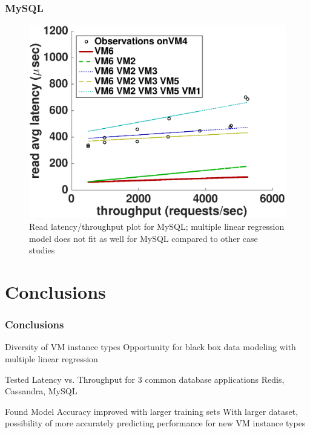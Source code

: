 \documentclass{beamer}
\begin{document}
\begin{frame}
\frametitle{MySQL}
  \begin{figure}
    \centering
    \includegraphics[scale = 0.3]{mysql_fit_read_avg_latency.eps}
    \caption{Read latency/throughput plot for MySQL; multiple linear regression model does not fit as well for MySQL compared to other case studies}
    \label{figure:mysql}
  \end{figure}
\end{frame}

\section{Conclusions}

\begin{frame}
\frametitle{Conclusions}
\begin{block}{Diversity of VM instance types}
Opportunity for black box data modeling with multiple linear regression
\end{block}
\begin{block}{Tested Latency vs. Throughput for 3 common database applications}
Redis, Cassandra, MySQL
\end{block}
\begin{block}{Found Model Accuracy improved with larger training sets}
With larger dataset, possibility of more accurately predicting performance for new VM instance types
\end{block}
\end{frame}
\end{document}
